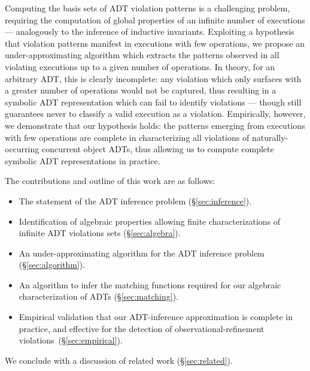 Computing the basis sets of ADT violation patterns is a challenging problem,
requiring the computation of global properties of an infinite number of
executions — analogously to the inference of inductive invariants. Exploiting a
hypothesis that violation patterns manifest in executions with few operations,
we propose an under-approximating algorithm which extracts the patterns
observed in all violating executions up to a given number of operations. In
theory, for an arbitrary ADT, this is clearly incomplete: any violation which
only surfaces with a greater number of operations would not be captured, thus
resulting in a symbolic ADT representation which can fail to identify
violations — though still guarantees never to classify a valid execution as a
violation. Empirically, however, we demonstrate that our hypothesis holds: the
patterns emerging from executions with few operations are complete in
characterizing all violations of naturally-occurring concurrent object ADTs,
thus allowing us to compute complete symbolic ADT representations in practice.

The contributions and outline of this work are as follows:
\begin{itemize}

  \item The statement of the ADT inference problem (§\ref{sec:inference}).

  \item Identification of algebraic properties allowing finite
  characterizations of infinite ADT violations sets (§\ref{sec:algebra}).

  \item An under-approximating algorithm for the ADT inference problem
  (§\ref{sec:algorithm}).

  \item An algorithm to infer the matching functions required for our algebraic
  characterization of ADTs (§\ref{sec:matching}).

  \item Empirical validation that our ADT-inference approximation is complete
  in practice, and effective for the detection of observational-refinement
  violations~(§\ref{sec:empirical}).

\end{itemize}
We conclude with a discussion of related work (§\ref{sec:related}).
